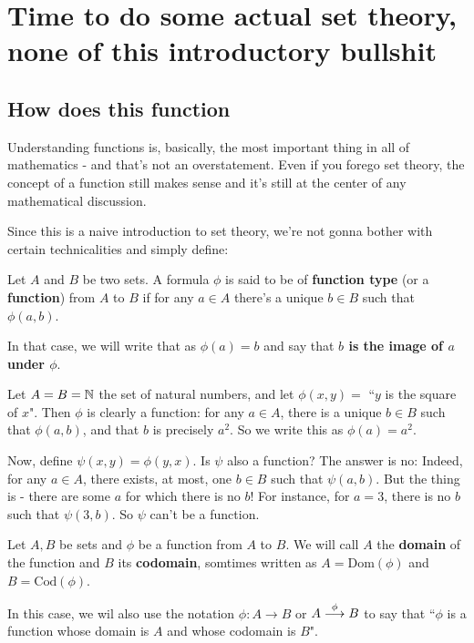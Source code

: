 \section{Time to do some actual set theory, none of this introductory bullshit}
\subsection{How does this function}

Understanding functions is, basically, the most important thing in all of mathematics - and that's not an overstatement. Even if you forego set theory, the concept of a function still makes sense and it's still at the center of any mathematical discussion.

Since this is a naive introduction to set theory, we're not gonna bother with certain technicalities and simply define:

\begin{df}
	Let $A$ and $B$ be two sets. A formula $\phi$ is said to be of \textbf{function type} (or a \textbf{function}) from $A$ to $B$ if for any $a\in A$ there's a unique $b\in B$ such that $\phi(a,b)$.
	
	In that case, we will write that as $\phi(a)=b$ and say that \textbf{$b$ is the image of $a$ under $\phi$}.
\end{df}

\begin{ex}
	Let $A=B=\mathbb N$ the set of natural numbers, and let $\phi(x,y)=$ ``$y$ is the square of $x$". Then $\phi$ is clearly a function: for any $a\in A$, there is a unique $b\in B$ such that $\phi(a,b)$, and that $b$ is precisely $a^2$. So we write this as $\phi(a)=a^2$.
	
	Now, define $\psi(x,y)=\phi(y,x)$. Is $\psi$ also a function? The answer is no: Indeed, for any $a\in A$, there exists, at most, one $b\in B$ such that $\psi(a,b)$. But the thing is - there are some $a$ for which there is no $b$! For instance, for $a=3$, there is no $b$ such that $\psi(3,b)$. So $\psi$ can't be a function.
\end{ex}

\begin{df}
	Let $A,B$ be sets and $\phi$ be a function from $A$ to $B$. We will call $A$ the \textbf{domain} of the function and $B$ its \textbf{codomain}, somtimes written as $A=\mathrm{Dom}(\phi)$ and $B=\mathrm{Cod}(\phi)$.
	
	In this case, we wil also use the notation $\phi:A\to B$ or $A\stackrel{\phi}{\longrightarrow}B$ to say that ``$\phi$ is a function whose domain is $A$ and whose codomain is $B$".
\end{df}

